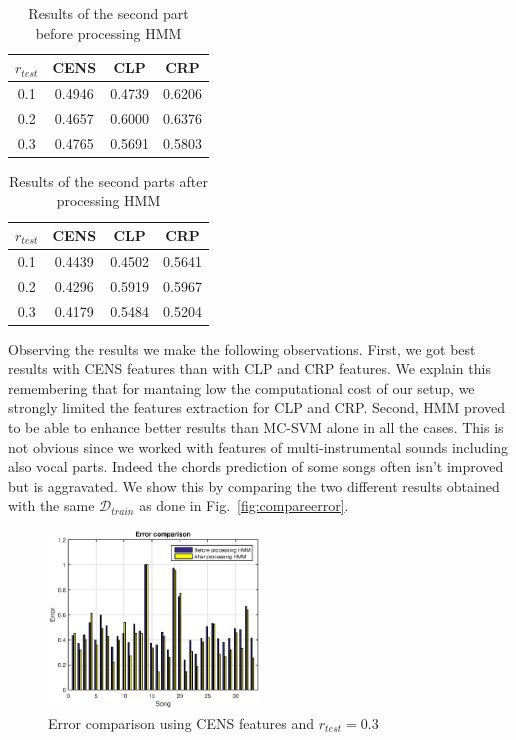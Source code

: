\begin{table}[h!]
	\caption{Results of the second part before processing HMM}
	\centering
	\begin{tabular}{|c |c c c|}
	\hline
	$r_{test}$ & CENS & CLP & CRP\\ \hline
	0.1 & 0.4946 & 0.4739 & 0.6206\\
	0.2 & 0.4657 & 0.6000 & 0.6376\\
	0.3 & 0.4765 & 0.5691 & 0.5803\\
	\hline
	\end{tabular}
	\label{tab:resultbeforeHMM}
\end{table}

\begin{table}[h!]
	\caption{Results of the second parts after processing HMM}
	\centering
	\begin{tabular}{|c |c c c|}
	\hline
	$r_{test}$ & CENS & CLP & CRP\\ \hline
	0.1 & 0.4439 & 0.4502 & 0.5641\\
	0.2 & 0.4296 & 0.5919 & 0.5967\\
	0.3 & 0.4179 & 0.5484 & 0.5204\\
	\hline
	\end{tabular}
	\label{tab:resultafterHMM}
\end{table}

 Observing the results we make the following observations. First, we got best results with CENS features than with CLP and CRP features. We explain this remembering that for mantaing low the computational cost of our setup, we strongly limited the features extraction for CLP and CRP. Second, HMM proved to be able to enhance better results than MC-SVM alone in all the cases. This is not obvious since we worked with features of multi-instrumental sounds including also vocal parts. Indeed the chords prediction of some songs often isn't improved but is aggravated. We show this by comparing the two different results obtained with the same $\mathcal{D}_{train}$ as done in Fig.~\ref{fig:compareerror}.

\begin{figure} [h!]
	\includegraphics[width=0.5\textwidth]{img/Result_HMM/CENS/plot03071}
	\caption{Error comparison using CENS features and $r_{test}=0.3$}
	\label{fig:copareerror}
\end{figure}

